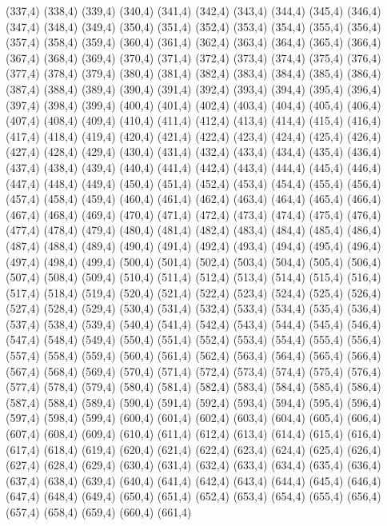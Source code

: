 (337,4)
(338,4)
(339,4)
(340,4)
(341,4)
(342,4)
(343,4)
(344,4)
(345,4)
(346,4)
(347,4)
(348,4)
(349,4)
(350,4)
(351,4)
(352,4)
(353,4)
(354,4)
(355,4)
(356,4)
(357,4)
(358,4)
(359,4)
(360,4)
(361,4)
(362,4)
(363,4)
(364,4)
(365,4)
(366,4)
(367,4)
(368,4)
(369,4)
(370,4)
(371,4)
(372,4)
(373,4)
(374,4)
(375,4)
(376,4)
(377,4)
(378,4)
(379,4)
(380,4)
(381,4)
(382,4)
(383,4)
(384,4)
(385,4)
(386,4)
(387,4)
(388,4)
(389,4)
(390,4)
(391,4)
(392,4)
(393,4)
(394,4)
(395,4)
(396,4)
(397,4)
(398,4)
(399,4)
(400,4)
(401,4)
(402,4)
(403,4)
(404,4)
(405,4)
(406,4)
(407,4)
(408,4)
(409,4)
(410,4)
(411,4)
(412,4)
(413,4)
(414,4)
(415,4)
(416,4)
(417,4)
(418,4)
(419,4)
(420,4)
(421,4)
(422,4)
(423,4)
(424,4)
(425,4)
(426,4)
(427,4)
(428,4)
(429,4)
(430,4)
(431,4)
(432,4)
(433,4)
(434,4)
(435,4)
(436,4)
(437,4)
(438,4)
(439,4)
(440,4)
(441,4)
(442,4)
(443,4)
(444,4)
(445,4)
(446,4)
(447,4)
(448,4)
(449,4)
(450,4)
(451,4)
(452,4)
(453,4)
(454,4)
(455,4)
(456,4)
(457,4)
(458,4)
(459,4)
(460,4)
(461,4)
(462,4)
(463,4)
(464,4)
(465,4)
(466,4)
(467,4)
(468,4)
(469,4)
(470,4)
(471,4)
(472,4)
(473,4)
(474,4)
(475,4)
(476,4)
(477,4)
(478,4)
(479,4)
(480,4)
(481,4)
(482,4)
(483,4)
(484,4)
(485,4)
(486,4)
(487,4)
(488,4)
(489,4)
(490,4)
(491,4)
(492,4)
(493,4)
(494,4)
(495,4)
(496,4)
(497,4)
(498,4)
(499,4)
(500,4)
(501,4)
(502,4)
(503,4)
(504,4)
(505,4)
(506,4)
(507,4)
(508,4)
(509,4)
(510,4)
(511,4)
(512,4)
(513,4)
(514,4)
(515,4)
(516,4)
(517,4)
(518,4)
(519,4)
(520,4)
(521,4)
(522,4)
(523,4)
(524,4)
(525,4)
(526,4)
(527,4)
(528,4)
(529,4)
(530,4)
(531,4)
(532,4)
(533,4)
(534,4)
(535,4)
(536,4)
(537,4)
(538,4)
(539,4)
(540,4)
(541,4)
(542,4)
(543,4)
(544,4)
(545,4)
(546,4)
(547,4)
(548,4)
(549,4)
(550,4)
(551,4)
(552,4)
(553,4)
(554,4)
(555,4)
(556,4)
(557,4)
(558,4)
(559,4)
(560,4)
(561,4)
(562,4)
(563,4)
(564,4)
(565,4)
(566,4)
(567,4)
(568,4)
(569,4)
(570,4)
(571,4)
(572,4)
(573,4)
(574,4)
(575,4)
(576,4)
(577,4)
(578,4)
(579,4)
(580,4)
(581,4)
(582,4)
(583,4)
(584,4)
(585,4)
(586,4)
(587,4)
(588,4)
(589,4)
(590,4)
(591,4)
(592,4)
(593,4)
(594,4)
(595,4)
(596,4)
(597,4)
(598,4)
(599,4)
(600,4)
(601,4)
(602,4)
(603,4)
(604,4)
(605,4)
(606,4)
(607,4)
(608,4)
(609,4)
(610,4)
(611,4)
(612,4)
(613,4)
(614,4)
(615,4)
(616,4)
(617,4)
(618,4)
(619,4)
(620,4)
(621,4)
(622,4)
(623,4)
(624,4)
(625,4)
(626,4)
(627,4)
(628,4)
(629,4)
(630,4)
(631,4)
(632,4)
(633,4)
(634,4)
(635,4)
(636,4)
(637,4)
(638,4)
(639,4)
(640,4)
(641,4)
(642,4)
(643,4)
(644,4)
(645,4)
(646,4)
(647,4)
(648,4)
(649,4)
(650,4)
(651,4)
(652,4)
(653,4)
(654,4)
(655,4)
(656,4)
(657,4)
(658,4)
(659,4)
(660,4)
(661,4)
